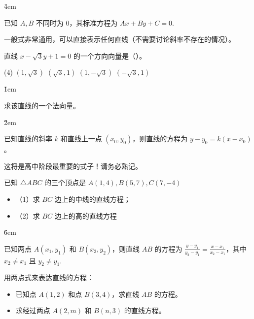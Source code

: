 \v{4em}

\begin{definition}[一般式]
    已知 $A, B$ 不同时为 $0$，其标准方程为 $Ax+By+C=0$.

    一般式非常通用，可以直接表示任何直线（不需要讨论斜率不存在的情况）。
\end{definition}

\begin{example}
    直线 $x-\sqrt{3} y+1=0$ 的一个方向向量是（\quad ）。
    \begin{tasks}(4)
        \task $(1, \sqrt{3})$
        \task $(\sqrt{3}, 1)$
        \task $(1, -\sqrt{3})$
        \task $(-\sqrt{3}, 1)$
    \end{tasks}
\end{example}

\v{1em}

\begin{tips}
    求该直线的一个法向量。
\end{tips}

\v{2em}

\begin{definition}[点斜式]
    已知直线的斜率 $k$ 和直线上一点 $(x_0, y_0)$，则直线的方程为 $y - y_0 = k(x - x_0)$。
\end{definition}

\begin{warning}
    这将是高中阶段最重要的式子！请务必熟记。
\end{warning}

\begin{example}
    已知 $\triangle A B C$ 的三个顶点是 $A(1,4), B(5,7), C(7,-4)$
    \begin{itemize}
        \item （1）求 $B C$ 边上的中线的直线方程；
        \item （2）求 $B C$ 边上的高的直线方程
    \end{itemize}
\end{example}

\v{6em}

\begin{definition}[两点式]
    已知两点 $A(x_1, y_1)$ 和 $B(x_2, y_2)$，则直线 $AB$ 的方程为 $\frac{y-y_1}{y_2-y_1} = \frac{x-x_1}{x_2-x_1}$，其中 $x_2 \neq x_1$ 且 $y_2 \neq y_1$.
\end{definition}

\begin{example}
    用两点式来表达直线的方程：
    \begin{itemize}
        \item 已知点 $A(1,2)$ 和点 $B(3,4)$，求直线 $AB$ 的方程。
        \item 求经过两点 $A(2,m)$ 和 $B(n,3)$ 的直线方程。
    \end{itemize}
\end{example}

